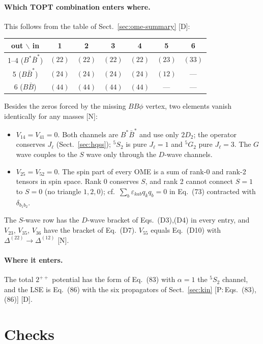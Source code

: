 \documentclass[11pt,a4paper]{article}
\newcommand{\tagP}[1]{\textcolor{blue!65!black}{\textsf{\small[P:\,#1]}}}
\newcommand{\tagD}{\textcolor{orange!85!black}{\textsf{\small[D]}}}
\newcommand{\tagN}{\textcolor{red!70!black}{\textsf{\small[N]}}}
\newcommand{\BB}{B\bar B}
\newcommand{\BBst}{B\bar B^*}
\newcommand{\BstBst}{B^*\bar B^*}
\newcommand{\D}[2]{\Delta^{(#1)}_{#2}}
\begin{document}
\paragraph{Which TOPT combination enters where.} This follows from the table of Sect.~\ref{sec:ome-summary} \tagD:
\begin{center}
\small
\begin{tabular}{c|cccc|c|c}
out $\backslash$ in & 1 & 2 & 3 & 4 & 5 & 6\\
\hline
1--4 ($\BstBst$) & $(22)$ & $(22)$ & $(22)$ & $(22)$ & $(23)$ & $(33)$\\
5 ($\BBst$) & $(24)$ & $(24)$ & $(24)$ & $(24)$ & $(12)$ & ---\\
6 ($\BB$) & $(44)$ & $(44)$ & $(44)$ & $(44)$ & --- & ---\\
\end{tabular}
\end{center}
Besides the zeros forced by the missing $BB\phi$ vertex, two elements vanish identically for any masses \tagN:
\begin{itemize}
\item $V_{14}=V_{41}=0$. Both channels are $\BstBst$ and use only $2D_2$; the operator conserves $J_\ell$ (Sect.~\ref{sec:hqss}); $^5S_2$ is pure $J_\ell=1$ and $^5G_2$ pure $J_\ell=3$. The $G$ wave couples to the $S$ wave only through the $D$-wave channels.
\item $V_{25}=V_{52}=0$. The spin part of every OME is a sum of rank-0 and rank-2 tensors in spin space. Rank 0 conserves $S$, and rank 2 cannot connect $S=1$ to $S=0$ (no triangle $1,2,0$); cf.\ $\sum_b\varepsilon_{kab}q_kq_b=0$ in Eq.~(73) contracted with $\delta_{b_1b_2}$.
\end{itemize}
The $S$-wave row has the $D$-wave bracket of Eqs.~(D3),(D4) in every entry, and $V_{23}$, $V_{35}$, $V_{36}$ have the bracket of Eq.~(D7). $V_{55}$ equals Eq.~(D10) with $\D{22}{}\to\D{12}{}$ \tagN.

\paragraph{Where it enters.} The total $2^{++}$ potential has the form of Eq.~(83) with $\alpha=1$ the $^5S_2$ channel, and the LSE is Eq.~(86) with the six propagators of Sect.~\ref{sec:kin} \tagP{Eqs.~(83),(86)} \tagD.

\section{Checks}
\label{sec:checks}
\end{document}
